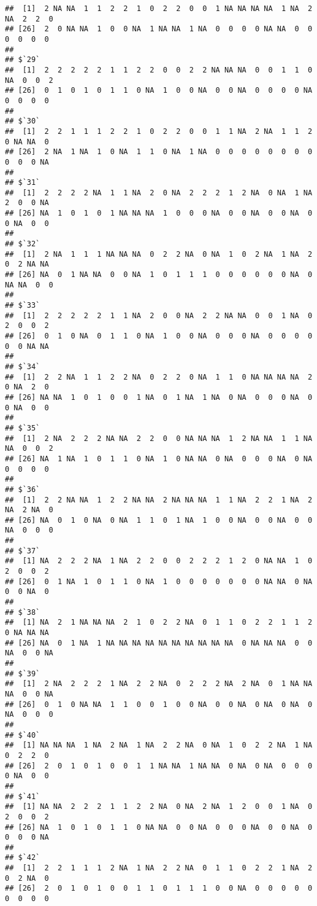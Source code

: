 \documentclass[
]{article}
\begin{document}
\begin{verbatim}
##  [1]  2 NA NA  1  1  2  2  1  0  2  2  0  0  1 NA NA NA NA  1 NA  2 NA  2  2  0
## [26]  2  0 NA NA  1  0  0 NA  1 NA NA  1 NA  0  0  0  0 NA NA  0  0  0  0  0  0
## 
## $`29`
##  [1]  2  2  2  2  2  1  1  2  2  0  0  2  2 NA NA NA  0  0  1  1  0 NA  0  0  2
## [26]  0  1  0  1  0  1  1  0 NA  1  0  0 NA  0  0 NA  0  0  0  0 NA  0  0  0  0
## 
## $`30`
##  [1]  2  2  1  1  1  2  2  1  0  2  2  0  0  1  1 NA  2 NA  1  1  2  0 NA NA  0
## [26]  2 NA  1 NA  1  0 NA  1  1  0 NA  1 NA  0  0  0  0  0  0  0  0  0  0  0 NA
## 
## $`31`
##  [1]  2  2  2  2 NA  1  1 NA  2  0 NA  2  2  2  1  2 NA  0 NA  1 NA  2  0  0 NA
## [26] NA  1  0  1  0  1 NA NA NA  1  0  0  0 NA  0  0 NA  0  0 NA  0  0 NA  0  0
## 
## $`32`
##  [1]  2 NA  1  1  1 NA NA NA  0  2  2 NA  0 NA  1  0  2 NA  1 NA  2  0  2 NA NA
## [26] NA  0  1 NA NA  0  0 NA  1  0  1  1  1  0  0  0  0  0  0 NA  0 NA NA  0  0
## 
## $`33`
##  [1]  2  2  2  2  2  1  1 NA  2  0  0 NA  2  2 NA NA  0  0  1 NA  0  2  0  0  2
## [26]  0  1  0 NA  0  1  1  0 NA  1  0  0 NA  0  0  0 NA  0  0  0  0  0  0 NA NA
## 
## $`34`
##  [1]  2  2 NA  1  1  2  2 NA  0  2  2  0 NA  1  1  0 NA NA NA NA  2  0 NA  2  0
## [26] NA NA  1  0  1  0  0  1 NA  0  1 NA  1 NA  0 NA  0  0  0 NA  0  0 NA  0  0
## 
## $`35`
##  [1]  2 NA  2  2  2 NA NA  2  2  0  0 NA NA NA  1  2 NA NA  1  1 NA NA  0  0  2
## [26] NA  1 NA  1  0  1  1  0 NA  1  0 NA NA  0 NA  0  0  0 NA  0 NA  0  0  0  0
## 
## $`36`
##  [1]  2  2 NA NA  1  2  2 NA NA  2 NA NA NA  1  1 NA  2  2  1 NA  2 NA  2 NA  0
## [26] NA  0  1  0 NA  0 NA  1  1  0  1 NA  1  0  0 NA  0  0 NA  0  0 NA  0  0  0
## 
## $`37`
##  [1] NA  2  2  2 NA  1 NA  2  2  0  0  2  2  2  1  2  0 NA NA  1  0  2  0  0  2
## [26]  0  1 NA  1  0  1  1  0 NA  1  0  0  0  0  0  0  0 NA NA  0 NA  0  0 NA  0
## 
## $`38`
##  [1] NA  2  1 NA NA NA  2  1  0  2  2 NA  0  1  1  0  2  2  1  1  2  0 NA NA NA
## [26] NA  0  1 NA  1 NA NA NA NA NA NA NA NA NA NA  0 NA NA NA  0  0 NA  0  0 NA
## 
## $`39`
##  [1]  2 NA  2  2  2  1 NA  2  2 NA  0  2  2  2 NA  2 NA  0  1 NA NA NA  0  0 NA
## [26]  0  1  0 NA NA  1  1  0  0  1  0  0 NA  0  0 NA  0 NA  0 NA  0 NA  0  0  0
## 
## $`40`
##  [1] NA NA NA  1 NA  2 NA  1 NA  2  2 NA  0 NA  1  0  2  2 NA  1 NA  0  2  2  0
## [26]  2  0  1  0  1  0  0  1  1 NA NA  1 NA NA  0 NA  0 NA  0  0  0  0 NA  0  0
## 
## $`41`
##  [1] NA NA  2  2  2  1  1  2  2 NA  0 NA  2 NA  1  2  0  0  1 NA  0  2  0  0  2
## [26] NA  1  0  1  0  1  1  0 NA NA  0  0 NA  0  0  0 NA  0  0 NA  0  0  0  0 NA
## 
## $`42`
##  [1]  2  2  1  1  1  2 NA  1 NA  2  2 NA  0  1  1  0  2  2  1 NA  2  0  2 NA  0
## [26]  2  0  1  0  1  0  0  1  1  0  1  1  1  0  0 NA  0  0  0  0  0  0  0  0  0

\end{verbatim}
\end{document}
